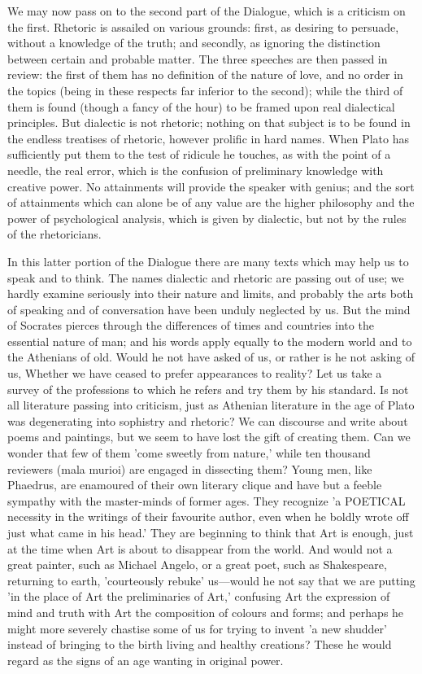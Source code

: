 \documentclass[11pt,letter]{article}
\begin{document}
\par  We may now pass on to the second part of the Dialogue, which is a criticism on the first. Rhetoric is assailed on various grounds: first, as desiring to persuade, without a knowledge of the truth; and secondly, as ignoring the distinction between certain and probable matter. The three speeches are then passed in review: the first of them has no definition of the nature of love, and no order in the topics (being in these respects far inferior to the second); while the third of them is found (though a fancy of the hour) to be framed upon real dialectical principles. But dialectic is not rhetoric; nothing on that subject is to be found in the endless treatises of rhetoric, however prolific in hard names. When Plato has sufficiently put them to the test of ridicule he touches, as with the point of a needle, the real error, which is the confusion of preliminary knowledge with creative power. No attainments will provide the speaker with genius; and the sort of attainments which can alone be of any value are the higher philosophy and the power of psychological analysis, which is given by dialectic, but not by the rules of the rhetoricians.

\par  In this latter portion of the Dialogue there are many texts which may help us to speak and to think. The names dialectic and rhetoric are passing out of use; we hardly examine seriously into their nature and limits, and probably the arts both of speaking and of conversation have been unduly neglected by us. But the mind of Socrates pierces through the differences of times and countries into the essential nature of man; and his words apply equally to the modern world and to the Athenians of old. Would he not have asked of us, or rather is he not asking of us, Whether we have ceased to prefer appearances to reality? Let us take a survey of the professions to which he refers and try them by his standard. Is not all literature passing into criticism, just as Athenian literature in the age of Plato was degenerating into sophistry and rhetoric? We can discourse and write about poems and paintings, but we seem to have lost the gift of creating them. Can we wonder that few of them 'come sweetly from nature,' while ten thousand reviewers (mala murioi) are engaged in dissecting them? Young men, like Phaedrus, are enamoured of their own literary clique and have but a feeble sympathy with the master-minds of former ages. They recognize 'a POETICAL necessity in the writings of their favourite author, even when he boldly wrote off just what came in his head.' They are beginning to think that Art is enough, just at the time when Art is about to disappear from the world. And would not a great painter, such as Michael Angelo, or a great poet, such as Shakespeare, returning to earth, 'courteously rebuke' us—would he not say that we are putting 'in the place of Art the preliminaries of Art,' confusing Art the expression of mind and truth with Art the composition of colours and forms; and perhaps he might more severely chastise some of us for trying to invent 'a new shudder' instead of bringing to the birth living and healthy creations? These he would regard as the signs of an age wanting in original power.
\end{document}
